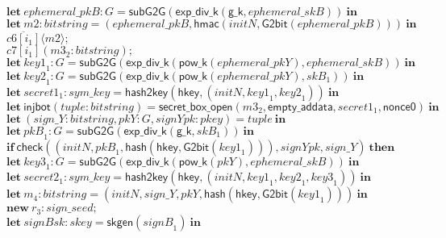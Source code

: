 \documentclass{article}
\newcommand{\cinput}[2]{{#1}({#2})}
\newcommand{\coutput}[2]{\overline{#1}\langle{#2}\rangle}
\newcommand{\kw}[1]{\mathbf{#1}}
\newcommand{\kwf}[1]{\mathsf{#1}}
\newcommand{\var}[1]{\mathit{#1}}
\newcommand{\kwt}[1]{\mathit{#1}}
\newcommand{\kwc}[1]{\mathit{#1}}
\begin{document}
\begin{tabbing}
\>$\quad \kw{let}\ \var{ephemeral{\_}pkB}: \kwt{G} = \kwf{subG2G}(\kwf{exp{\_}div{\_}k}(\kwf{g{\_}k}, \var{ephemeral{\_}skB}))\ \kw{in}$\\
\>$\quad \kw{let}\ \var{m2}: \kwt{bitstring} = \kwf{}(\var{ephemeral{\_}pkB}, \kwf{hmac}(\var{initN}, \kwf{G2bit}(\var{ephemeral{\_}pkB})))\ \kw{in}$\\
\>$\quad \coutput{\kwc{c6}[\var{i}_{1}]}{\var{m2}};$\\
\>$\quad \cinput{\kwc{c7}[\var{i}_{1}]}{\var{m3}_{2}: \kwt{bitstring}};$\\
\>$\quad \kw{let}\ \var{key1}_{1}: \kwt{G} = \kwf{subG2G}(\kwf{exp{\_}div{\_}k}(\kwf{pow{\_}k}(\var{ephemeral{\_}pkY}), \var{ephemeral{\_}skB}))\ \kw{in}$\\
\>$\quad \kw{let}\ \var{key2}_{1}: \kwt{G} = \kwf{subG2G}(\kwf{exp{\_}div{\_}k}(\kwf{pow{\_}k}(\var{ephemeral{\_}pkY}), \var{skB}_{1}))\ \kw{in}$\\
\>$\quad \kw{let}\ \var{secret1}_{1}: \kwt{sym{\_}key} = \kwf{hash2key}(\kwf{hkey}, \kwf{}(\var{initN}, \var{key1}_{1}, \var{key2}_{1}))\ \kw{in}$\\
\>$\quad \kw{let}\ \kwf{injbot}(\var{tuple}: \kwt{bitstring}) = \kwf{secret{\_}box{\_}open}(\var{m3}_{2}, \kwf{empty{\_}addata}, \var{secret1}_{1}, \kwf{nonce0})\ \kw{in}$\\
\>$\quad \kw{let}\ \kwf{}(\var{sign{\_}Y}: \kwt{bitstring}, \var{pkY}: \kwt{G}, \var{signYpk}: \kwt{pkey}) = \var{tuple}\ \kw{in}$\\
\>$\quad \kw{let}\ \var{pkB}_{1}: \kwt{G} = \kwf{subG2G}(\kwf{exp{\_}div{\_}k}(\kwf{g{\_}k}, \var{skB}_{1}))\ \kw{in}$\\
\>$\quad \kw{if}\ \kwf{check}(\kwf{}(\var{initN}, \var{pkB}_{1}, \kwf{hash}(\kwf{hkey}, \kwf{G2bit}(\var{key1}_{1}))), \var{signYpk}, \var{sign{\_}Y})\ \kw{then}$\\
\>$\quad \kw{let}\ \var{key3}_{1}: \kwt{G} = \kwf{subG2G}(\kwf{exp{\_}div{\_}k}(\kwf{pow{\_}k}(\var{pkY}), \var{ephemeral{\_}skB}))\ \kw{in}$\\
\>$\quad \kw{let}\ \var{secret2}_{1}: \kwt{sym{\_}key} = \kwf{hash2key}(\kwf{hkey}, \kwf{}(\var{initN}, \var{key1}_{1}, \var{key2}_{1}, \var{key3}_{1}))\ \kw{in}$\\
\>$\quad \kw{let}\ \var{m}_{4}: \kwt{bitstring} = \kwf{}(\var{initN}, \var{sign{\_}Y}, \var{pkY}, \kwf{hash}(\kwf{hkey}, \kwf{G2bit}(\var{key1}_{1})))\ \kw{in}$\\
\>$\quad \kw{new}\ \var{r}_{3}: \kwt{sign{\_}seed};$\\
\>$\quad \kw{let}\ \var{signBsk}: \kwt{skey} = \kwf{skgen}(\var{signB}_{1})\ \kw{in}$\\

\end{tabbing}
\end{document}
